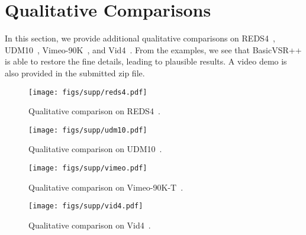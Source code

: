 \documentclass[10pt,twocolumn,letterpaper]{article}
\begin{document}
\section{Qualitative Comparisons}
In this section, we provide additional qualitative comparisons on REDS4~\cite{nah2019ntire}, UDM10~\cite{yi2019progressive}, Vimeo-90K~\cite{xue2019video}, and Vid4~\cite{liu2014bayesian}. From the examples, we see that BasicVSR++ is able to restore the fine details, leading to plausible results. A video demo is also provided in the submitted zip file.

\begin{figure*}[!t]
    \begin{center}
        \texttt{[image: figs/supp/reds4.pdf]}
        \vskip -0.35cm
        \caption{Qualitative comparison on REDS4~\cite{wang2019edvr}.}
        \label{fig:reds4}
    \end{center}
    \vspace{-0.2cm}
\end{figure*}
\begin{figure*}[!t]
    \begin{center}
        \texttt{[image: figs/supp/udm10.pdf]}
        \vskip -0.35cm
        \caption{Qualitative comparison on UDM10~\cite{yi2019progressive}.}
        \label{fig:udm10}
    \end{center}
    \vspace{-0.2cm}
\end{figure*}
\begin{figure*}[!t]
    \begin{center}
        \texttt{[image: figs/supp/vimeo.pdf]}
        \vskip -0.35cm
        \caption{Qualitative comparison on Vimeo-90K-T~\cite{xue2019video}.}
        \label{fig:vimeo}
    \end{center}
    \vspace{-0.2cm}
\end{figure*}
\begin{figure*}[!t]
    \begin{center}
        \texttt{[image: figs/supp/vid4.pdf]}
        \vskip -0.35cm
        \caption{Qualitative comparison on Vid4~\cite{liu2014bayesian}.}
        \label{fig:vid4}
    \end{center}
    \vspace{-0.2cm}
\end{figure*}

 
\end{document}
